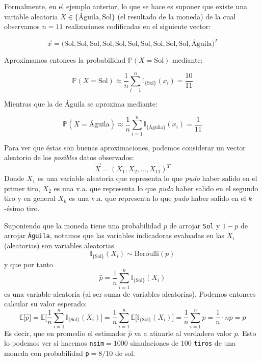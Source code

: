 \documentclass[
]{book}
\begin{document}
Formalmente, en el ejemplo anterior, lo que se hace es suponer que existe una variable aleatoria \(X \in\{ \text{Águila}, \text{Sol}\}\) (el resultado de la moneda) de la cual observamos \(n = 11\) realizaciones codificadas en el siguiente vector:

\[
\vec{x} = \big( \text{Sol}, \text{Sol},\text{Sol},\text{Sol},\text{Sol},\text{Sol},\text{Sol},\text{Sol},\text{Sol},\text{Sol},\text{Águila}\big)^T
\]

Aproximamos entonces la probabilidad \(\mathbb{P}(X = \text{Sol})\) mediante:

\[
\mathbb{P}(X = \text{Sol}) \approx \dfrac{1}{n}\sum\limits_{i=1}^n \mathbb{I}_{\{\text{Sol}\}}(x_i) = \dfrac{10}{11}
\]

Mientras que la de Águila se aproxima mediante:

\[
\mathbb{P}(X = \text{Águila}) \approx \dfrac{1}{n}\sum\limits_{i=1}^n \mathbb{I}_{\{\text{Águila}\}}(x_i) = \dfrac{1}{11}
\]

Para ver que éstas son buenas aproximaciones, podemos considerar un vector aleatorio de los \emph{posibles} datos observados:
\[
\vec{X} = (X_1, X_2, \dots, X_{11})^T
\]
Donde \(X_1\) es una variable aleatoria que representa lo que \emph{pudo} haber salido en el primer tiro, \(X_2\) es una v.a. que representa lo que \emph{pudo} haber salido en el segundo tiro y en general \(X_k\) es una v.a. que representa lo que \emph{pudo} haber salido en el \(k\)-ésimo tiro.

Suponiendo que la moneda tiene una probabilidad \(p\) de arrojar \texttt{Sol} y \(1-p\) de arrojar \texttt{Águila}, notamos que las variables indicadoras evaluadas en las \(X_i\) (aleatorias) son variables aleatorias
\[
\mathbb{I}_{\{\text{Sol}\}}(X_i) \sim \text{Beroulli}(p)
\]
y que por tanto
\[
\hat{p} = \dfrac{1}{n}\sum\limits_{i=1}^n \mathbb{I}_{\{\text{Sol}\}}(X_i)
\]
es una variable aleatoria (al ser suma de variables aleatorias). Podemos entonces calcular su valor esperado:
\[
\mathbb{E}\big[\hat{p}\big] = \mathbb{E}\bigg[\dfrac{1}{n}\sum\limits_{i=1}^n \mathbb{I}_{\{\text{Sol}\}}(X_i)\bigg] = \dfrac{1}{n}\sum\limits_{i=1}^n \mathbb{E}\big[ \mathbb{I}_{\{\text{Sol}\}}(X_i)\big] = \dfrac{1}{n}\sum\limits_{i=1}^n p = \dfrac{1}{n}\cdot np = p
\]
Es decir, que en promedio el estimador \(\hat{p}\) va a atinarle al verdadero valor \(p\). Esto lo podemos ver si hacemos \texttt{nsim}\(= 1000\) simulaciones de \(100\) \texttt{tiros} de una moneda con probabilidad \texttt{p}\(= 8/10\) de sol.
\end{document}
